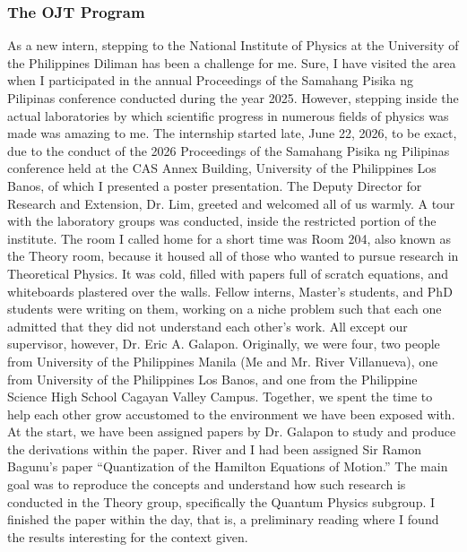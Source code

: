 \documentclass[a4paper]{article}
\begin{document}
	\subsubsection{The OJT Program}
	As a new intern, stepping to the National Institute of Physics at the University of the Philippines Diliman has been a challenge for me. Sure, I have visited the area when I participated in the annual Proceedings of the Samahang Pisika ng Pilipinas conference conducted during the year 2025. However, stepping inside the actual laboratories by which scientific progress in numerous fields of physics was made was amazing to me. The internship started late, June 22, 2026, to be exact, due to the conduct of the 2026 Proceedings of the Samahang Pisika ng Pilipinas conference held at the CAS Annex Building, University of the Philippines Los Banos, of which I presented a poster presentation. The Deputy Director for Research and Extension, Dr. Lim, greeted and welcomed all of us warmly. A tour with the laboratory groups was conducted, inside the restricted portion of the institute. The room I called home for a short time was Room 204, also known as the Theory room, because it housed all of those who wanted to pursue research in Theoretical Physics. It was cold, filled with papers full of scratch equations, and whiteboards plastered over the walls. Fellow interns, Master’s students, and PhD students were writing on them, working on a niche problem such that each one admitted that they did not understand each other’s work. All except our supervisor, however, Dr. Eric A. Galapon. Originally, we were four, two people from University of the Philippines Manila (Me and Mr. River Villanueva), one from University of the Philippines Los Banos, and one from the Philippine Science High School Cagayan Valley Campus. Together, we spent the time to help each other grow accustomed to the environment we have been exposed with. At the start, we have been assigned papers by Dr. Galapon to study and produce the derivations within the paper. River and I had been assigned Sir Ramon Bagunu’s paper “Quantization of the Hamilton Equations of Motion.” The main goal was to reproduce the concepts and understand how such research is conducted in the Theory group, specifically the Quantum Physics subgroup. I finished the paper within the day, that is, a preliminary reading where I found the results interesting for the context given.  \\
	
\end{document}
